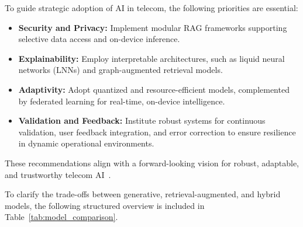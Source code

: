 To guide strategic adoption of AI in telecom, the following priorities are essential:
\begin{itemize}
    \item \textbf{Security and Privacy:} Implement modular RAG frameworks supporting selective data access and on-device inference.
    \item \textbf{Explainability:} Employ interpretable architectures, such as liquid neural networks (LNNs) and graph-augmented retrieval models.
    \item \textbf{Adaptivity:} Adopt quantized and resource-efficient models, complemented by federated learning for real-time, on-device intelligence.
    \item \textbf{Validation and Feedback:} Institute robust systems for continuous validation, user feedback integration, and error correction to ensure resilience in dynamic operational environments.
\end{itemize}
These recommendations align with a forward-looking vision for robust, adaptable, and trustworthy telecom AI~\cite{ref7, ref16, ref17, ref18, ref19, ref20, ref21, ref22, ref23, ref26, ref27, ref28, ref30}.

To clarify the trade-offs between generative, retrieval-augmented, and hybrid models, the following structured overview is included in Table~\ref{tab:model_comparison}.

